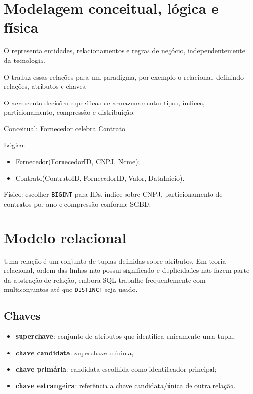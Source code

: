 \section{Modelagem conceitual, lógica e física}

O  representa entidades, relacionamentos e regras de negócio, independentemente da tecnologia.

O  traduz essas relações para um paradigma, por exemplo o relacional, definindo relações, atributos e chaves.

O  acrescenta decisões específicas de armazenamento: tipos, índices, particionamento, compressão e distribuição.

\begin{exemplo}
Conceitual: Fornecedor celebra Contrato.

Lógico:
\begin{itemize}
\item Fornecedor(FornecedorID, CNPJ, Nome);
\item Contrato(ContratoID, FornecedorID, Valor, DataInicio).
\end{itemize}

Físico: escolher \texttt{BIGINT} para IDs, índice sobre CNPJ, particionamento de contratos por ano e compressão conforme SGBD.
\end{exemplo}

\section{Modelo relacional}

Uma relação é um conjunto de tuplas definidas sobre atributos. Em teoria relacional, ordem das linhas não possui significado e duplicidades não fazem parte da abstração de relação, embora SQL trabalhe frequentemente com multiconjuntos até que \texttt{DISTINCT} seja usado.

\subsection{Chaves}

\begin{itemize}
\item \textbf{superchave}: conjunto de atributos que identifica unicamente uma tupla;
\item \textbf{chave candidata}: superchave mínima;
\item \textbf{chave primária}: candidata escolhida como identificador principal;
\item \textbf{chave estrangeira}: referência a chave candidata/única de outra relação.
\end{itemize}

